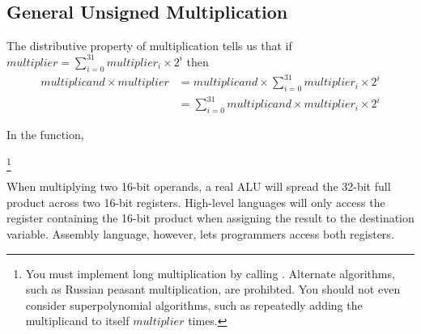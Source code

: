 \begin{description}
\end{description}


\subsection{General Unsigned Multiplication}

The distributive property of multiplication tells us that if $multiplier = \sum_{i=0}^{31}multiplier_i \times 2^i$ then
\begin{align*}
    multiplicand \times multiplier  & = multiplicand \times \sum_{i=0}^{31}multiplier_i \times 2^i \\
                                    & = \sum_{i=0}^{31} multiplicand \times multiplier_i \times 2^i
\end{align*}

In the  function,
\begin{description}
    \footnote{
        You must implement long multiplication by calling .
        Alternate algorithms, such as Russian peasant multiplication, are prohibted.
        You should not even consider superpolynomial algorithms, such as repeatedly adding the multiplicand to itself $multiplier$ times.
    }
\end{description}

When multiplying two 16-bit operands, a real ALU will spread the 32-bit full product across two 16-bit registers.
High-level languages will only access the register containing the 16-bit product when assigning the result to the destination variable.
Assembly language, however, lets programmers access both registers.

\begin{description}
\end{description}


